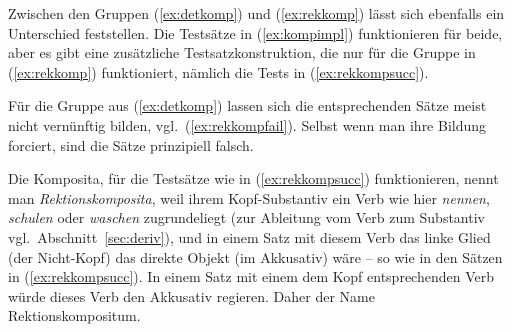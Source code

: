 \begin{exe}
  \ex\label{ex:kompimplfail}
  \begin{xlist}
  \end{xlist}
\end{exe}

Zwischen den Gruppen (\ref{ex:detkomp}) und (\ref{ex:rekkomp}) lässt sich ebenfalls ein Unterschied feststellen.
Die Testsätze in (\ref{ex:kompimpl}) funktionieren für beide, aber es gibt eine zusätzliche Testsatzkonstruktion, die nur für die Gruppe in (\ref{ex:rekkomp}) funktioniert, nämlich die Tests in (\ref{ex:rekkompsucc}).

\begin{exe}
  \ex\label{ex:rekkompsucc}
  \begin{xlist}
  \end{xlist}
\end{exe}

Für die Gruppe aus (\ref{ex:detkomp}) lassen sich die entsprechenden Sätze meist nicht vernünftig bilden, vgl.\ (\ref{ex:rekkompfail}).
Selbst wenn man ihre Bildung forciert, sind die Sätze prinzipiell falsch.
  
\begin{exe}
  \ex\label{ex:rekkompfail}
  \begin{xlist}
  \end{xlist}
\end{exe}

Die Komposita, für die Testsätze wie in (\ref{ex:rekkompsucc}) funktionieren, nennt man \textit{Rektionskomposita}, weil ihrem Kopf-Substantiv ein Verb wie hier \textit{nennen}, \textit{schulen} oder \textit{waschen} zugrundeliegt (zur Ableitung vom Verb zum Substantiv vgl.\ Abschnitt~\ref{sec:deriv}), und in einem Satz mit diesem Verb das linke Glied (der Nicht-Kopf) das direkte Objekt (im Akkusativ) wäre -- so wie in den Sätzen in (\ref{ex:rekkompsucc}).
In einem Satz mit einem dem Kopf entsprechenden Verb würde dieses Verb den Akkusativ regieren. 
Daher der Name Rektionskompositum.

